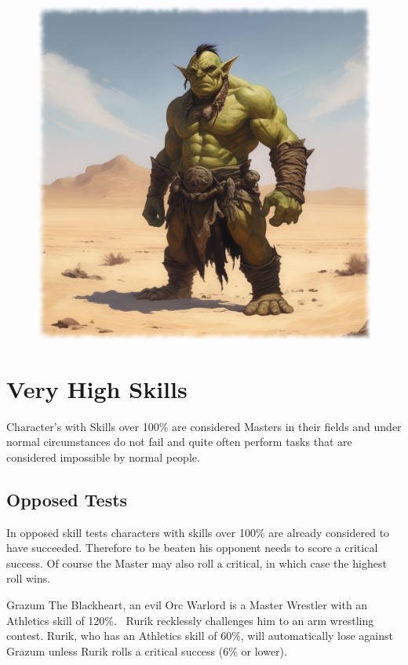 \begin{figure}[h]
\begin{center}
\includegraphics[scale=0.24]{img/ai-images/orc-wrestler.png}
\end{center}
\end{figure}

\section{Very High Skills}
Character’s with Skills over 100\% are considered Masters in their fields and under normal circumstances do not fail and quite often perform tasks that are considered impossible by normal people.

\subsection{Opposed Tests}
In opposed skill tests characters with skills over 100\% are already considered to have succeeded. Therefore to be beaten his opponent needs to score a critical success. Of course the Master may also roll a critical, in which case the highest roll wins.


\begin{rpg-examplebox}
Grazum The Blackheart, an evil Orc Warlord is a Master Wrestler with an Athletics skill of 120\%.  Rurik recklessly challenges him to an arm wrestling contest. Rurik, who has an Athletics skill of 60\%, will automatically lose against Grazum unless Rurik rolls a critical success (6\% or lower).
\end{rpg-examplebox}

